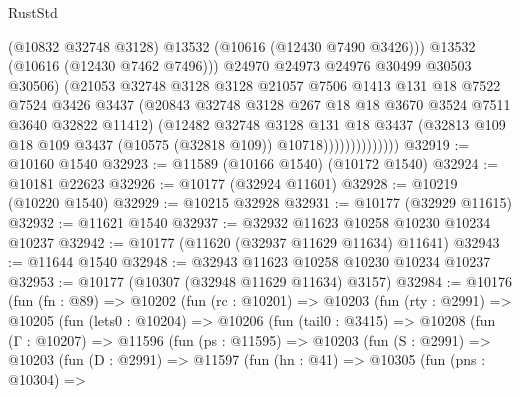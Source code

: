 \begin{lexlean}{RustStd}
\begin{coremodule}
                                (@10832 @32748 @3128)
                                @13532
                                (@10616 (@12430 @7490 @3426)))
                              @13532
                              (@10616 (@12430 @7462 @7496)))
                            @24970
                            @24973
                            @24976
                            @30499
                            @30503
                            @30506)
                          (@21053
                            @32748
                            @3128
                            @3128
                            @21057
                            @7506
                            @1413
                            @131
                            @18
                            @7522
                            @7524
                            @3426
                            @3437
                            (@20843 @32748 @3128 @267 @18 @18 @3670 @3524 @7511 @3640 @32822 @11412)
                            (@12482
                              @32748
                              @3128
                              @131
                              @18
                              @3437
                              (@32813
                                @109
                                @18
                                @109
                                @3437
                                (@10575 (@32818 @109))
                                @10718))))))))))))))
@32919 := @10160 @1540
@32923 := @11589 (@10166 @1540) (@10172 @1540)
@32924 := @10181 @22623
@32926 := @10177 (@32924 @11601)
@32928 := @10219 (@10220 @1540)
@32929 := @10215 @32928
@32931 := @10177 (@32929 @11615)
@32932 := @11621 @1540
@32937 := @32932 @11623 @10258 @10230 @10234 @10237
@32942 := @10177 (@11620 (@32937 @11629 @11634) @11641)
@32943 := @11644 @1540
@32948 := @32943 @11623 @10258 @10230 @10234 @10237
@32953 := @10177 (@10307 (@32948 @11629 @11634) @3157)
@32984 := @10176
    (fun (fn : @89) =>
    @10202
      (fun (rc : @10201) =>
      @10203
        (fun (rty : @2991) =>
        @10205
          (fun (lets0 : @10204) =>
          @10206
            (fun (tail0 : @3415) =>
            @10208
              (fun (Γ : @10207) =>
              @11596
                (fun (ps : @11595) =>
                @10203
                  (fun (S : @2991) =>
                  @10203
                    (fun (D : @2991) =>
                    @11597
                      (fun (hn : @41) =>
                      @10305
                        (fun (pns : @10304) =>

\end{coremodule}
\end{lexlean}
